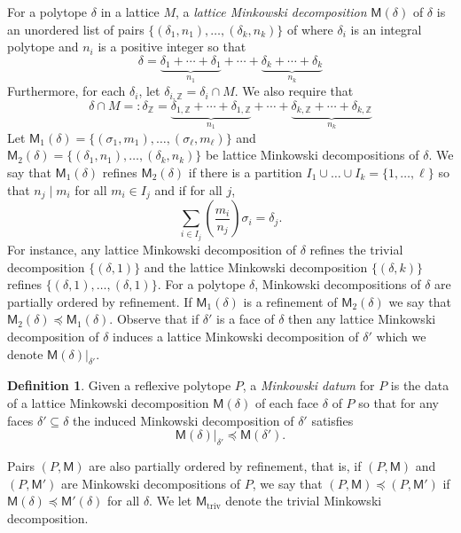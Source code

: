 \documentclass[10pt]{amsart}
\numberwithin{equation}{section}
\theoremstyle{plain}
\theoremstyle{definition}
\newtheorem{definition}[theorem]{Definition}
\theoremstyle{remark}
\begin{document}
For a polytope \(\delta\) in a lattice \(M\), a \emph{lattice Minkowski decomposition} \(\mathsf{M}(\delta)\) of \(\delta\) is an unordered list of pairs \(\{(\delta_1,n_1),\ldots, (\delta_k,n_k)\}\) of where \(\delta_i\) is an integral polytope and \(n_i\) is a positive integer so that
\[
  \delta = \underbrace{\delta_1 + \cdots + \delta_1}_{n_1} + \cdots + \underbrace{\delta_k + \cdots + \delta_k}_{n_k}
\]
Furthermore, for each \(\delta_i\), let \(\delta_{i,\mathbb{Z}} = \delta_i \cap M\). We also require that
\[
  \delta \cap M =: \delta_\mathbb{Z} = \underbrace{\delta_{1,\mathbb{Z}} + \cdots + \delta_{1,\mathbb{Z}}}_{n_1} + \cdots + \underbrace{\delta_{k,\mathbb{Z}} + \cdots + \delta_{k,\mathbb{Z}}}_{n_k}
\]
Let \(\mathsf{M}_1(\delta) = \{(\sigma_1,m_1),\dots, (\sigma_\ell, m_\ell)\}\) and \(\mathsf{M}_2(\delta) = \{(\delta_1,n_1),\dots, (\delta_k,n_k)\}\) be lattice Minkowski decompositions of \(\delta\). We say that \(\mathsf{M}_1(\delta)\) refines \(\mathsf{M}_2(\delta)\) if there is a partition \(I_1\cup \dots \cup I_k=\{1,\dots, \ell\}\) so that \(n_j \mid m_i\) for all \(m_i \in I_j\) and if for all \(j\),
\[
\sum_{i \in I_j} \left(\dfrac{m_i}{n_j}\right)\sigma_i = \delta_j.
\]
For instance, any lattice Minkowski decomposition of \(\delta\) refines the trivial decomposition \(\{(\delta,1)\}\) and the lattice Minkowski decomposition \(\{(\delta,k)\}\) refines \(\{(\delta,1),\dots, (\delta,1)\}\). For a polytope \(\delta\), Minkowski decompositions of \(\delta\) are partially ordered by refinement. If \(\mathsf{M}_1(\delta)\) is a refinement of \(\mathsf{M}_2(\delta)\) we say that \(\mathsf{M}_2(\delta) \preceq \mathsf{M}_1(\delta)\). Observe that if \(\delta'\) is a face of \(\delta\) then any lattice Minkowski decomposition of \(\delta\) induces a lattice Minkowski decomposition of \(\delta'\) which we denote \(\mathsf{M}(\delta)|_{\delta'}\).

\begin{definition}
  Given a reflexive polytope \(P\), a \emph{Minkowski datum} for \(P\) is the data of a lattice Minkowski decomposition \(\mathsf{M}(\delta)\) of each face \(\delta\) of \(P\) so that for any faces \(\delta' \subseteq \delta\) the induced Minkowski decomposition of \(\delta'\) satisfies
  \[
    \mathsf{M}(\delta)|_{\delta'} \preceq \mathsf{M}(\delta').
  \]
\end{definition}

Pairs \((P,\mathsf{M})\) are also partially ordered by refinement, that is, if \((P,\mathsf{M})\) and \((P,\mathsf{M}')\) are Minkowski decompositions of \(P\), we say that \((P,\mathsf{M}) \preceq (P,\mathsf{M}')\) if \(\mathsf{M}(\delta) \preceq \mathsf{M}'(\delta)\) for all \(\delta\). We let \(\mathsf{M}_\mathrm{triv}\) denote the trivial Minkowski decomposition.
\end{document}
